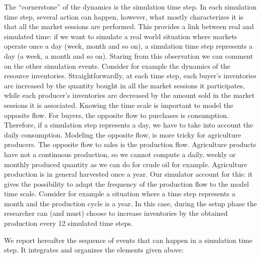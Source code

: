 \documentclass{article}
\begin{document}
The ``cornerstone'' of the dynamics is the simulation time step. In each simulation time step, several action can happen, however, what mostly characterizes it is that all the market sessions are performed.  
This provides a link between real and simulated time: if we want to simulate a real world situation where markets operate once a day (week, month and so on), a simulation time step represents a day (a week, a month and so on). Staring from this observation we can comment on the other simulation events. 
Consider for example the dynamics of the resource inventories. Straightforwardly, at each time step, each buyer's inventories are increased by the quantity bought in all the market sessions it participates, while each producer's inventories are decreased by the amount sold in the market sessions it is associated. Knowing the time scale is important to model the opposite flow. For buyers, the opposite flow to purchases is consumption. Therefore, if a simulation step represents a day, we have to take into account the daily consumption. Modeling the opposite flow, is more tricky for agriculture producers. The opposite flow to sales is the production flow. Agriculture products have not a continuous production, so we cannot compute a daily, weekly or monthly produced quantity as we can do for crude oil for example. Agriculture production is in general harvested once a year. Our simulator account for this: it gives the possibility to adapt the frequency of the production flow to the model time scale. Consider for example a situation where a time step represents a month and the production cycle is a year. In this case, during the setup phase the researcher can (and must) choose to increase inventories by the obtained production every 12 simulated time steps.   

We report hereafter the sequence of events that can happen in a simulation time step. It integrates and organizes the elements given above: 
\end{document}

